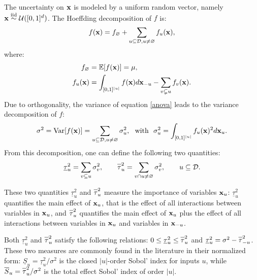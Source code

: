 The uncertainty on $\boldsymbol{\mathbf{x}}$ is modeled by a uniform random vector, namely $\boldsymbol{\mathbf{x}} \stackrel{{\rm iid}}{\sim} \mathcal{U}([0,1]^d)$. The Hoeffding decomposition \cite{Hoeffding,Sobol'} of $f$ is:
\begin{equation}
f(\boldsymbol{\mathbf{x}})=f_{\varnothing}+\sum \limits_{u \subseteq \mathcal{D}, u \neq \varnothing} f_u(\boldsymbol{\mathbf{x}}),
\label{anova}
\end{equation}
where:
\begin{align*}
f_{\varnothing} &= \mathbb{E}[f(\boldsymbol{\mathbf{x}})]= \mu, \\
f_u(\boldsymbol{\mathbf{x}}) &= \int_{[0,1]^{|u|}} f(\boldsymbol{\mathbf{x}}) d{\boldsymbol{\mathbf{x}}}_{-u} - \sum \limits_{v \subsetneq u} f_v(\boldsymbol{\mathbf{x}}).
\end{align*}
Due to orthogonality, the variance of equation \eqref{anova} leads to the variance decomposition of $f$:
\[ \sigma^2 = \mathrm{Var}[f(\vx)] = \sum \limits_{u \subseteq \mathcal{D}, u \neq \varnothing} \sigma_u^2, \ \text{ with } \ \sigma_u^2=\int_{[0,1]^{|u|}} f_u(\vx)^2 d{\vx_u}.\]
From this decomposition, one can define the following two quantities:
\[\underline{\tau}_u^2 = \sum \limits_{v \subseteq u} \sigma_v^2, \qquad
\ov{$\tau$}_u^2 = \sum \limits_{v \cap u \neq \varnothing} \sigma_v^2, \qquad u \subseteq \mathcal{D}.\]

These two quantities $\underline{\tau}_u^2$ and $\ov{$\tau$}_u^2$ measure the importance of variables $\boldsymbol{\mathbf{x}}_u$: $\underline{\tau}_u^2$ quantifies the main effect of $\boldsymbol{\mathbf{x}}_u$, that is the effect of all interactions between variables in $\boldsymbol{\mathbf{x}}_u$, and $\ov{$\tau$}_u^2$ quantifies the main effect of $\boldsymbol{\mathbf{x}}_u$ plus the effect of all interactions between variables in $\boldsymbol{\mathbf{x}}_u$ and variables in $\boldsymbol{\mathbf{x}}_{-u}$.

Both $\underline{\tau}_u^2$ and $\ov{$\tau$}_u^2$ satisfy the following relations: $ 0 \leq  \underline{\tau}_u^2 \leq \ov{$\tau$}_u^2$ and $\underline{\tau}_u^2 = \sigma^2 - \ov{$\tau$}_{-u}^2$. These two measures are commonly found in the literature in their normalized form: $\underline{S}_u = \underline{\tau}_u^2 / \sigma^2$ is the closed $|u|$-order Sobol' index for inputs $u$, while $\ov{$S$}_u = \ov{$\tau$}_u^2 / \sigma^2$ is the total effect Sobol' index of order $|u|$.
\bigskip

